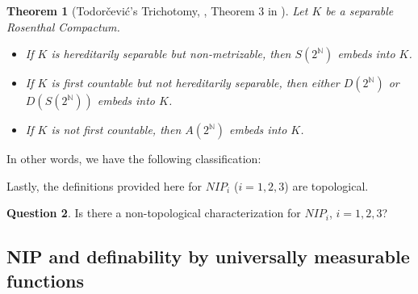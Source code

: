 \documentclass[psamsfonts]{amsart}
\newtheorem{thm}{Theorem}[section]
\theoremstyle{definition}
\newtheorem{question}[thm]{Question}
\theoremstyle{remark}
\numberwithin{equation}{section}
\begin{document}
\begin{thm}[Todorčević's Trichotomy, \cite{Todorcevic_1999_CompactSubsetsBaire}, Theorem 3 in \cite{argyros2008rosenthal}]
    Let $K$ be a separable Rosenthal Compactum.
    \begin{itemize}
        \item [(i)] If $K$ is hereditarily separable but non-metrizable, then $S(2^\mathbb{N})$ embeds into $K$.
        \item [(ii)] If $K$ is first countable but not hereditarily separable, then either $D(2^\mathbb{N})$ or $D(S(2^\mathbb{N}))$ embeds into $K$.
        \item [(iii)] If $K$ is not first countable, then $A(2^\mathbb{N})$ embeds into $K$.
    \end{itemize}
\end{thm}

In other words, we have the following classification:

\begin{center}
\end{center}

Lastly, the definitions provided here for $NIP_i$ ($i=1,2,3$) are topological.

\begin{question}
    Is there a non-topological characterization for $NIP_i$, $i=1,2,3$?
\end{question}

\subsection{NIP and definability by universally measurable functions}
\end{document}
